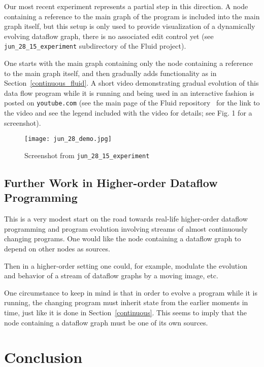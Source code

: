 \documentclass{llncs}
\begin{document}
Our most recent experiment represents a partial step in this direction. A  node containing a reference to the main graph of the program
is included  into the main graph itself, but this setup is only used to provide visualization of a dynamically evolving dataflow
graph, there is no associated edit control yet  (see {\tt jun\_28\_15\_experiment} subdirectory of the Fluid project).

One starts with the main graph containing only the node containing a reference to the main graph itself, and then
gradually adds functionality as in Section~\ref{continuous_fluid}.
A short video demonstrating gradual evolution of this data flow program while it is running and being used in an interactive
fashion is posted on {\tt youtube.com} (see the main page of the Fluid repository~\cite{Fluid} for the link
to the video and see the legend included with the video for details; see Fig. 1 for a screenshot).

\begin{figure}\label{bukatin_figure}

\centering
\texttt{[image: jun\_28\_demo.jpg]}

\caption{Screenshot from {\tt jun\_28\_15\_experiment} }

\end{figure}

\subsection{Further Work in Higher-order Dataflow Programming}

This is a very modest start on the road towards real-life higher-order dataflow programming and program evolution
involving streams of almost continuously changing programs. One would like the node containing a dataflow graph
to depend on other nodes as sources.

Then in a higher-order setting one could, for example, modulate the evolution and behavior of a stream of dataflow graphs by a moving image, etc.

One circumstance to keep in mind is that in order to evolve a program while it is running, the changing program must inherit state from the earlier
moments in time, just like it is done in Section~\ref{continuous}. This seems to imply that the node containing a dataflow graph must be one of
its own sources.

\section{Conclusion}
\end{document}
